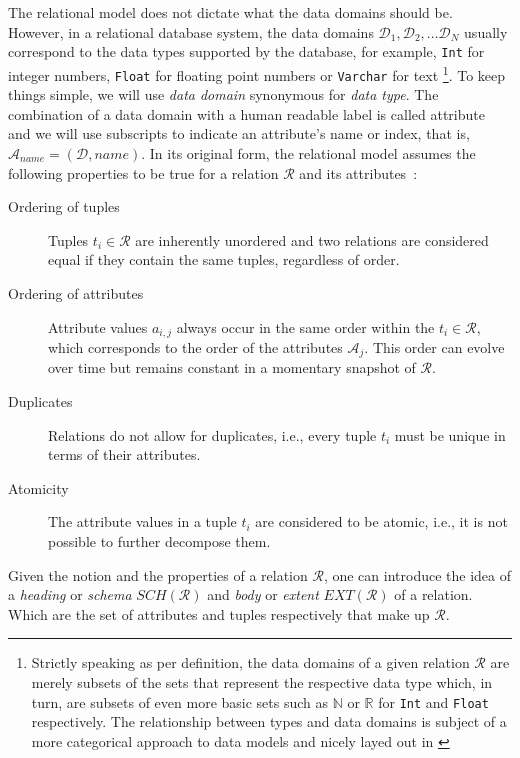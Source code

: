 The relational model does not dictate what the data domains should be. However, in a relational database system, the data domains $\mathcal{D}_1, \mathcal{D}_2, ... \mathcal{D}_N$ usually correspond to the data types supported by the database, for example, \lstinline{Int} for integer numbers, \lstinline{Float} for floating point numbers or \lstinline{Varchar} for text \footnote{Strictly speaking as per definition, the data domains of a given relation $\mathcal{R}$ are merely subsets of the sets that represent the respective data type which, in turn, are subsets of even more basic sets such as $\mathbb{N}$ or $\mathbb{R}$ for \lstinline{Int} and \lstinline{Float} respectively. The relationship between types and data domains is subject of a more categorical approach to data models and nicely layed out in \cite{Spivak:2009Simplicial}}. To keep things simple, we will use \emph{data domain} synonymous for \emph{data type}. The combination of a data domain with a human readable label is called attribute and we will use subscripts to indicate an attribute's name or index, that is, $\mathcal{A}_{name} = (\mathcal{D}, name)$. In its original form, the relational model assumes the following properties to be true for a relation $\mathcal{R}$ and its attributes~\cite{Codd:1970Relational}:

\begin{description}
    \item[Ordering of tuples] Tuples $t_i \in \mathcal{R}$ are inherently unordered and two relations are considered equal if they contain the same tuples, regardless of order.
    \item[Ordering of attributes] Attribute values $a_{i,j}$ always occur in the same order within the $t_i \in \mathcal{R}$, which corresponds to the order of the attributes $\mathcal{A}_j$. This order can evolve over time but remains constant in a momentary snapshot of $\mathcal{R}$.
    \item[Duplicates] Relations do not allow for duplicates, i.e., every tuple $t_i$ must be unique in terms of their attributes.
    \item[Atomicity] The attribute values in a tuple $t_i$ are considered to be atomic, i.e., it is not possible to further decompose them.
\end{description}

Given the notion and the properties of a relation $\mathcal{R}$, one can introduce the idea of a \emph{heading} or \emph{schema} $SCH(\mathcal{R})$ and \emph{body} or \emph{extent} $EXT(\mathcal{R})$ of a relation. Which are the set of attributes and tuples respectively that make up $\mathcal{R}$.

